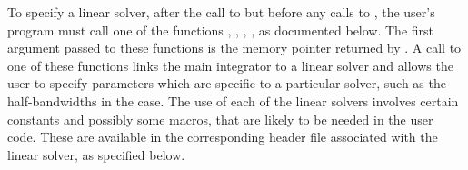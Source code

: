 To specify a {\cvode} linear solver, after the call to 
but before any calls to , the user's program must call one
of the functions , , , ,
as documented below. The first argument passed to these functions is the {\cvode}
memory pointer returned by .  A call to one of these
functions links the main {\cvode} integrator to a linear solver and
allows the user to specify parameters which are specific to a
particular solver, such as the half-bandwidths in the {\cvband} case.
The use of each of the linear solvers involves certain constants and possibly 
some macros, that are likely to be needed in the user code.  These are
available in the corresponding header file associated with the linear
solver, as specified below.

